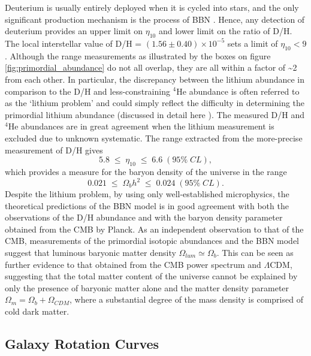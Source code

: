 Deuterium is usually entirely deployed when it is cycled into stars, and the only significant production mechanism is the process of BBN \cite{pns}. Hence, any detection of deuterium provides an upper limit on $\eta_{10}$ and lower limit on the ratio of D/H. The local interstellar value of D/H = $(1.56 \pm 0.40) \times 10^{−5}$ sets a limit of $\eta_{10} < 9$ \cite{d_h_measurements}. Although the \eta range measurements as illustrated by the boxes on figure \ref{fig:primordial_abundance} do not all overlap, they are all within a factor of \sim2 from each other. In particular, the discrepancy between the lithium abundance in comparison to the D/H and less-constraining $^4$He abundance is often referred to as the `lithium problem' and could simply reflect the difficulty in determining the primordial lithium abundance (discussed in detail here \cite{Fields_2011}). The measured D/H and $^4$He abundances are in great agreement when the lithium measurement is excluded due to unknown systematic. The \eta range extracted from the more-precise measurement of D/H gives
%
\begin{equation}
    5.8 \; \leq \; \eta_{10} \; \leq \; 6.6 \; (95\% \; CL),
\end{equation}
%
which provides a measure for the baryon density of the universe in the range
%
\begin{equation}
    0.021 \; \leq \; \Omega_{b}h^2 \; \leq \; 0.024 \; (95\% \; CL).
\end{equation}
%
Despite the lithium problem, by using only well-established microphysics, the theoretical predictions of the BBN model is in good agreement with both the observations of the D/H abundance and with the baryon density parameter obtained from the CMB by Planck. As an independent observation to that of the CMB, measurements of the primordial isotopic abundances and the BBN model suggest that luminous baryonic matter density $\Omega_{lum} \simeq \Omega_{b}$. This can be seen as further evidence to that obtained from the CMB power spectrum and $\Lambda$CDM, suggesting that the total matter content of the universe cannot be explained by only the presence of baryonic matter alone and the matter density parameter $\Omega_{m} = \Omega_{b} + \Omega_{CDM}$, where a substantial degree of the mass density is comprised of cold dark matter. 

\subsection{Galaxy Rotation Curves}
\label{subsec:rotation_curves}

